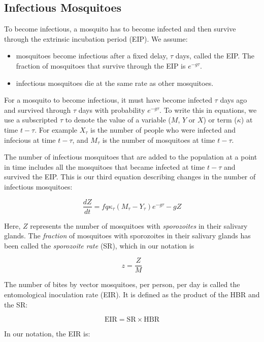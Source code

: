 \documentclass[
]{book}
\begin{document}
\subsection{Infectious Mosquitoes}\label{infectious-mosquitoes}

To become infectious, a mosquito has to become infected and then survive through the extrinsic incubation period (EIP). We assume:

\begin{itemize}
\item
  mosquitoes become infectious after a fixed delay, \(\tau\) days, called the EIP. The fraction of mosquitoes that survive through the EIP is \(e^{-g \tau}\).
\item
  infectious mosquitoes die at the same rate as other mosquitoes.
\end{itemize}

For a mosquito to become infectious, it must have become infected \(\tau\) days ago and survived through \(\tau\) days with probability \(e^{-g\tau}\). To write this in equations, we use a subscripted \(\tau\) to denote the value of a variable (\(M\), \(Y\) or \(X\)) or term (\(\kappa\)) at time \(t-\tau\). For example \(X_\tau\) is the number of people who were infected and infecious at time \(t-\tau\), and \(M_\tau\) is the number of mosquitoes at time \(t-\tau\).

The number of infectious mosquitoes that are added to the population at a point in time includes all the mosquitoes that became infected at time \(t-\tau\) and survived the EIP. This is our third equation describing changes in the number of infectious mosquitoes:

\begin{equation}
\frac{dZ}{dt} = f q  \kappa_\tau (M_\tau-Y_\tau) e^{-g\tau} -g Z
\end{equation}

Here, \(Z\) represents the number of mosquitoes with \emph{sporozoites} in their salivary glands. The \emph{fraction} of mosquitoes with sporozoites in their salivary glands has been called the \emph{sporozoite rate} (SR), which in our notation is

\[ z = \frac{Z}{M}\]

The number of bites by vector mosquitoes, per person, per day is called the entomological inoculation rate (EIR). It is defined as the product of the HBR and the SR:

\[\mbox{EIR} = \mbox{SR} \times \mbox{HBR}\]

In our notation, the EIR is:
\end{document}
